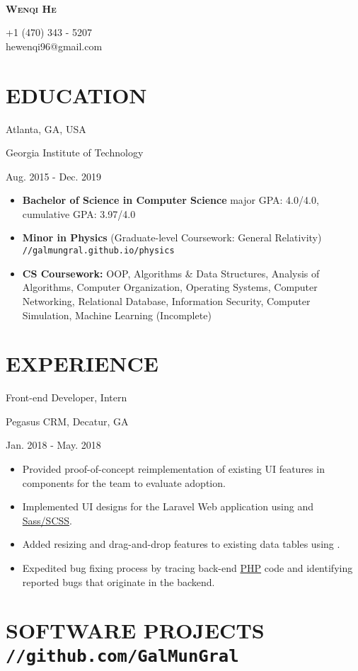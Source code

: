 \documentclass[11pt]{article}
\newcommand{\centertitle}[3]{
	{\noindent\bfseries
	\parbox[][0.5em][b]{0.35\textwidth}{#1\hfill}%
	\parbox[][0.5em][b]{0.3\textwidth}{\centerline{#2}}%
	\parbox[][0.5em][b]{0.35\textwidth}{\hfill#3}}
}
\begin{document}
\noindent
\parbox{0.2\textwidth}{\,}
\parbox{0.6\textwidth}{\centerline{\huge\scshape\bfseries Wenqi He}}
\parbox{0.2\textwidth}{+1 (470) 343 - 5207 \\hewenqi96@gmail.com}

\section*{EDUCATION}
\centertitle{Atlanta, GA, USA}{Georgia Institute of Technology}{Aug. 2015 - Dec. 2019}
\begin{itemize}[leftmargin=15pt, noitemsep, topsep=0pt]
\item \textbf{Bachelor of Science in Computer Science} \hfill major GPA: 4.0/4.0, cumulative GPA: 3.97/4.0
\item \textbf{Minor in Physics} (Graduate-level Coursework: General Relativity) \hfill \texttt{//galmungral.github.io/physics}
\item \textbf{CS Coursework:} OOP, Algorithms \& Data Structures, Analysis of Algorithms, Computer Organization, Operating Systems, Computer Networking, Relational Database, Information Security, Computer Simulation, Machine Learning (Incomplete)
\end{itemize}
\vspace{-0.5em}

\section*{EXPERIENCE}
\centertitle{Front-end Developer, Intern}{Pegasus CRM, Decatur, GA}{Jan. 2018 - May. 2018}
\begin{itemize}[leftmargin=15pt, noitemsep, topsep=0pt]
\item Provided proof-of-concept reimplementation of existing UI features in \underline{} components for the team to evaluate adoption.
\item Implemented UI designs for the Laravel Web application using \underline{} and \underline{Sass/SCSS}. 
\item Added resizing and drag-and-drop features to existing data tables using \underline{}.
\item Expedited bug fixing process by tracing back-end \underline{PHP} code and identifying reported bugs that originate in the backend.
\end{itemize}
\vspace{-0.5em}

\section*{SOFTWARE PROJECTS \hfill \normalsize\texttt{//github.com/GalMunGral}}
\end{document}
